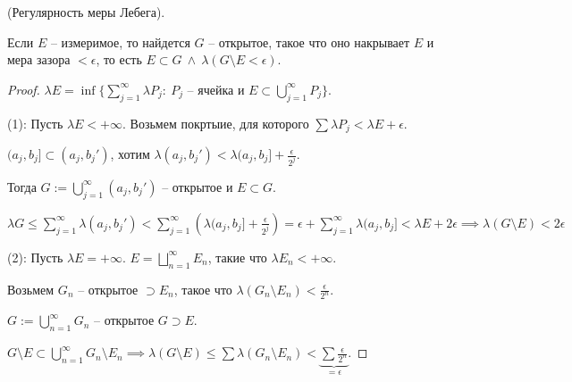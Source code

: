 \begin{theorem}
    (Регулярность меры Лебега).
    
    Если $E$ -- измеримое, то найдется $G$ -- открытое, такое что оно накрывает $E$ и мера зазора $< \epsilon$, то есть $E \subset G \ \land \ \lambda (G \setminus E < \epsilon)$.
\end{theorem}
\begin{proof}
    $\lambda E = \inf \{ \sum_{j=1}^{\infty} \lambda P_j : \ P_j \text{ -- ячейка и } E \subset \bigcup_{j=1}^{\infty} P_j \}$.

    (1): Пусть $\lambda E < + \infty$. Возьмем покртыие, для которого $\sum \lambda P_j < \lambda E + \epsilon$.

    $(a_j, b_j] \subset (a_j, b_j')$, хотим $\lambda (a_j, b_j') < \lambda(a_j, b_j] + \frac{\epsilon}{2^j}$.

    Тогда $G := \bigcup_{j=1}^{\infty} (a_j, b_j')$ -- открытое и $E \subset G$.

    $\lambda G \leq \sum_{j=1}^{\infty} \lambda (a_j, b_j') < \sum_{j=1}^{\infty} \left( \lambda (a_j, b_j] + \frac{\epsilon}{2^j} \right) = \epsilon + \sum_{j=1}^{\infty} \lambda (a_j, b_j] < \lambda E + 2 \epsilon \implies \lambda (G \setminus E) < 2 \epsilon$


    (2): Пусть $\lambda E = +\infty$. $E = \bigsqcup_{n=1}^{\infty} E_n$, такие что $\lambda E_n < +\infty$. 

    Возьмем $G_n$ -- открытое $\supset E_n$, такое что $\lambda (G_n \setminus E_n) < \frac{\epsilon}{2^n}$.
    
    $G:=\bigcup_{n=1}^{\infty} G_n$ -- открытое $G \supset E$.

    $G \setminus E \subset \bigcup_{n=1}^{\infty} G_n \setminus E_n \implies \lambda (G \setminus E) \leq \sum \lambda (G_n \setminus E_n) < \underbrace{\sum \frac{\epsilon}{2^n}}_{= \epsilon}$.
\end{proof}

